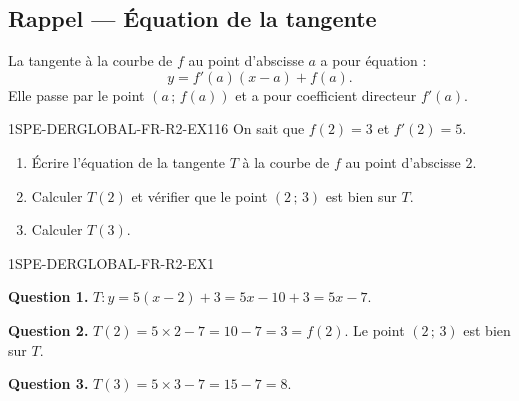 

\subsection*{Rappel — Équation de la tangente}

La tangente à la courbe de $f$ au point d'abscisse $a$ a pour équation :
\[
  y = f'(a)(x - a) + f(a).
\]
Elle passe par le point $(a\,;\,f(a))$ et a pour coefficient directeur $f'(a)$.


\begin{exercice}{1SPE-DERGLOBAL-FR-R2-EX1}{1}{6}
On sait que $f(2) = 3$ et $f'(2) = 5$.
\begin{enumerate}
  \item Écrire l'équation de la tangente $T$ à la courbe de $f$ au point d'abscisse $2$.
  \item Calculer $T(2)$ et vérifier que le point $(2\,;\,3)$ est bien sur $T$.
  \item Calculer $T(3)$.
\end{enumerate}
\end{exercice}


\begin{corrige}{1SPE-DERGLOBAL-FR-R2-EX1}


\textbf{Question 1.}
$T : y = 5(x - 2) + 3 = 5x - 10 + 3 = 5x - 7.$

\textbf{Question 2.}
$T(2) = 5 \times 2 - 7 = 10 - 7 = 3 = f(2).$ \checkmark Le point $(2\,;\,3)$ est bien sur $T$.

\textbf{Question 3.}
$T(3) = 5 \times 3 - 7 = 15 - 7 = 8.$

\end{corrige}

